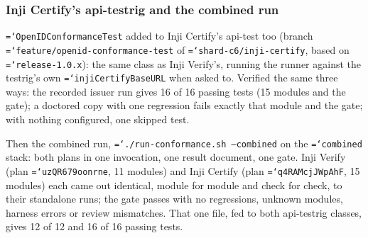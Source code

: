 \documentclass[11pt,a4paper]{article}
\let\origtexttt\texttt
\renewcommand{\texttt}[1]{\origtexttt{\hyphenchar\font=`\-\relax #1}}
\renewcommand{\_}{\textunderscore\allowbreak}
\begin{document}
\subsubsection*{Inji Certify's api-testrig and the combined run}
\texttt{OpenIDConformanceTest} added to Inji Certify's api-test too (branch
\texttt{feature/openid-conformance-test} of \texttt{shard-c6/inji-certify}, based on
\texttt{release-1.0.x}): the same class as Inji Verify's, running the runner against the
testrig's own \texttt{injiCertifyBaseURL} when asked to. Verified the same three ways: the
recorded issuer run gives 16 of 16 passing tests (15 modules and the gate); a doctored copy with
one regression fails exactly that module and the gate; with nothing configured, one skipped test.

Then the combined run, \texttt{./run-conformance.sh --combined} on the \texttt{combined} stack:
both plans in one invocation, one result document, one gate. Inji Verify (plan
\texttt{uzQR679oonrne}, 11 modules) and Inji Certify (plan \texttt{q4RAMcjJWpAhF}, 15 modules)
each came out identical, module for module and check for check, to their standalone runs; the
gate passes with no regressions, unknown modules, harness errors or review mismatches. That one
file, fed to both api-testrig classes, gives 12 of 12 and 16 of 16 passing tests.
\end{document}
